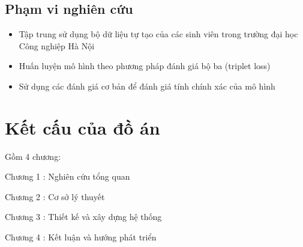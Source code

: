 \subsection{Phạm vi nghiên cứu}
\begin{itemize}
      \item Tập trung sử dụng bộ dữ liệu tự tạo của các sinh viên trong trường đại học Công nghiệp Hà Nội
      \item Huấn luyện mô hình theo phương pháp đánh giá bộ ba (triplet loss)
      \item Sử dụng các đánh giá cơ bản để đánh giá tính chính xác của mô hình
\end{itemize}

\newpage
\section{Kết cấu của đồ án}
Gồm 4 chương:

Chương 1 : Nghiên cứu tổng quan

Chương 2 : Cơ sở lý thuyết

Chương 3 : Thiết kế và xây dựng hệ thống

Chương 4 : Kết luận và hướng phát triển





